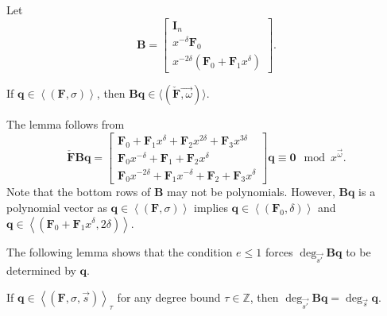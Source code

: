 Let \[
\mathbf{B}=\left[\begin{array}{c}
\mathbf{I}_{n}\\
x^{-\delta}\mathbf{F}_{0}\\
x^{-2\delta}\left(\mathbf{F}_{0}+\mathbf{F}_{1}x^{\delta}\right)\end{array}\right].\]

\begin{lem}
\label{lem:qToBqOrder}If $\mathbf{q}\in\left\langle \left(\mathbf{F},\sigma\right)\right\rangle $,
then $\mathbf{B}\mathbf{q}\in\langle(\check{\mathbf{F}}\vec{,\omega})\rangle$.\end{lem}
\begin{pf}
The lemma follows from \[
\check{\mathbf{F}}\mathbf{B}\mathbf{q}=\left[\begin{array}{r}
\mathbf{F}_{0}+\mathbf{F}_{1}x^{\delta}+\mathbf{F}_{2}x^{2\delta}+\mathbf{F}_{3}x^{3\delta}\\
\mathbf{F}_{0}x^{-\delta}+\mathbf{F}_{1}+\mathbf{F}_{2}x^{\delta}\\
\mathbf{F}_{0}x^{-2\delta}+\mathbf{F}_{1}x^{-\delta}+\mathbf{F}_{2}+\mathbf{F}_{3}x^{\delta}\end{array}\right]\mathbf{q}\equiv\mathbf{0}\mod x^{\vec{\omega}}.\]
 Note that the bottom rows of $\mathbf{B}$ may not be polynomials.
However, $\mathbf{B}\mathbf{q}$ is a polynomial vector as $\mathbf{q}\in\left\langle \left(\mathbf{F},\sigma\right)\right\rangle $
implies $\mathbf{q}\in\left\langle \left(\mathbf{F}_{0},\delta\right)\right\rangle $
and $\mathbf{q}\in\left\langle \left(\mathbf{F}_{0}+\mathbf{F}_{1}x^{\delta},2\delta\right)\right\rangle $. 
\end{pf}
\noindent The following lemma shows that the condition $e\le1$ forces
$\deg_{\vec{s'}}\mathbf{B}\mathbf{q}$ to be determined by $\mathbf{q}$. 
\begin{lem}
\label{lem:qToBqDegree}If $\mathbf{q}\in\left\langle \left(\mathbf{F},\sigma,\vec{s}\right)\right\rangle _{\tau}$
\textup{for any degree bound $\tau\in\mathbb{Z}$}, then $\deg_{\vec{s'}}\mathbf{B}\mathbf{q}=\deg_{\vec{s}}\mathbf{q}$.\end{lem}
